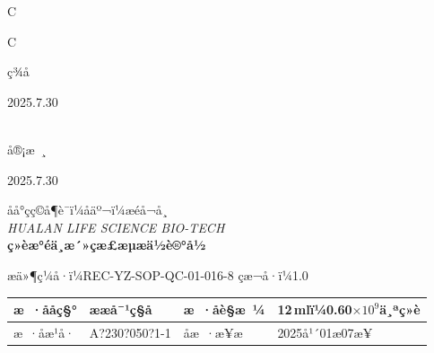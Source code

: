 \documentclass[UTF8,10pt,a4paper,fontset=fandol]{ctexart}
\newcommand{\fieldvalue}[1]{#1}
\newcommand{\handwritten}[1]{#1}
\begin{document}
\begin{center}
\begin{center}
\vspace{1em}


\vspace{8em}

\handwritten{C}

\vfill

\handwritten{C}

\vfill

\begin{flushright}
\handwritten{ç­¾å}

\quad
\handwritten{2025.7.30}

\\[1em]

\handwritten{å®¡æ ¸}

\quad
\handwritten{2025.7.30}
\end{flushright}

\newpage

\begin{center}
åå°çç©å¶è¯ï¼åäº¬ï¼æéå¬å¸\\
\textit{HUALAN LIFE SCIENCE BIO-TECH}\\[2pt]
\textbf{ç»èæ°éä¸æ´»çæ£æµæä½è®°å½}
\end{center}

\noindent
æä»¶ç¼å·ï¼REC-YZ-SOP-QC-01-016-8 \hfill çæ¬å·ï¼1.0

\begin{tabularx}{\textwidth}{|l|X|l|X|}
\hline
æ ·ååç§° &
\fieldvalue{\handwritten{ææå¯¹ç§å}} &
æ ·åè§æ ¼ &
\fieldvalue{\handwritten{12\,mlï¼0.60$\times 10^{9}$ä¸ªç»è}}\\
\hline
æ ·åæ¹å· &
\fieldvalue{\handwritten{A?230?050?1-1}} &
åæ ·æ¥æ &
\fieldvalue{\handwritten{2025å¹´01æ07æ¥}}\\
\hline
\end{tabularx}


\end{center}
\end{center}
\end{document}
